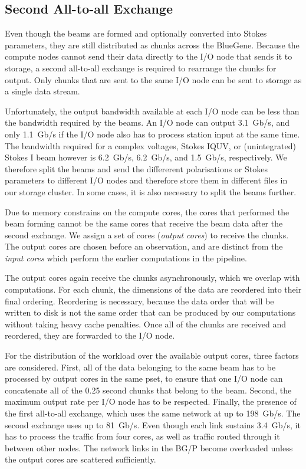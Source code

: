 \documentclass{llncs}
\begin{document}
\subsection{Second All-to-all Exchange}

Even though the beams are formed and optionally converted into Stokes parameters, they are still distributed as chunks across the BlueGene. Because the compute nodes cannot send their data directly to the I/O node that sends it to storage, a second all-to-all exchange is required to rearrange the chunks for output. Only chunks that are sent to the same I/O node can be sent to storage as a single data stream.

Unfortunately, the output bandwidth available at each I/O node can be less than the bandwidth required by the beams. An I/O node can output 3.1~Gb/s, and only 1.1~Gb/s if the I/O node also has to process station input at the same time. The bandwidth required for a complex voltages, Stokes IQUV, or (unintegrated) Stokes I beam however is 6.2~Gb/s, 6.2~Gb/s, and 1.5~Gb/s, respectively. We therefore split the beams and send the differerent polarisations or Stokes parameters to different I/O nodes and therefore store them in different files in our storage cluster. In some cases, it is also necessary to split the beams further.

Due to memory constrains on the compute cores, the cores that performed the beam forming cannot be the same cores that receive the beam data after the second exchange. We assign a set of cores (\emph{output cores}) to receive the chunks. The output cores are chosen before an observation, and are distinct from the \emph{input cores} which perform the earlier computations in the pipeline.

The output cores again receive the chunks asynchronously, which we overlap with computations. For each chunk, the dimensions of the data are reordered into their final ordering. Reordering is necessary, because the data order that will be written to disk is not the same order that can be produced by our computations without taking heavy cache penalties. Once all of the chunks are received and reordered, they are forwarded to the I/O node.

For the distribution of the workload over the available output cores, three factors are considered. First, all of the data belonging to the same beam has to be processed by output cores in the same pset, to ensure that one I/O node can concatenate all of the 0.25 second chunks that belong to the beam. Second, the maximum output rate per I/O node has to be respected. Finally, the presence of the first all-to-all exchange, which uses the same network at up to 198~Gb/s. The second exchange uses up to 81~Gb/s. Even though each link sustains 3.4~Gb/s, it has to process the traffic from four cores, as well as traffic routed through it between other nodes. The network links in the BG/P become overloaded unless the output cores are scattered sufficiently.
\end{document}
